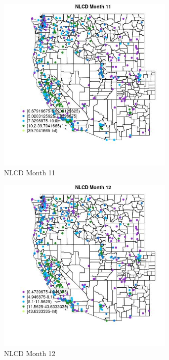 \begin{figure} 
\centering  
\includegraphics[width=0.77\textwidth]{Code_Outputs/ML_input_report_ML_input_PM25_Step5_part_d_de_duplicated_aves_ML_input_MapObsMo11NLCD.jpg} 
\caption{\label{fig:ML_input_report_ML_input_PM25_Step5_part_d_de_duplicated_aves_ML_inputMapObsMo11NLCD}NLCD Month 11} 
\end{figure} 
 

\clearpage 

\begin{figure} 
\centering  
\includegraphics[width=0.77\textwidth]{Code_Outputs/ML_input_report_ML_input_PM25_Step5_part_d_de_duplicated_aves_ML_input_MapObsMo12NLCD.jpg} 
\caption{\label{fig:ML_input_report_ML_input_PM25_Step5_part_d_de_duplicated_aves_ML_inputMapObsMo12NLCD}NLCD Month 12} 
\end{figure} 
 
